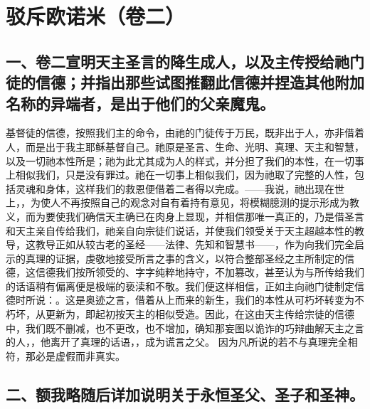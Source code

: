\section{驳斥欧诺米（卷二）}


\subsection{一、卷二宣明天主圣言的降生成人，以及主传授给祂门徒的信德；并指出那些试图推翻此信德并捏造其他附加名称的异端者，是出于他们的父亲魔鬼。}

基督徒的信德，按照我们主的命令，由祂的门徒传于万民，既非出于人，亦非借着人，而是出于我主耶稣基督自己。祂原是圣言、生命、光明、真理、天主和智慧，以及一切祂本性所是；祂为此尤其成为人的样式，并分担了我们的本性，在一切事上相似我们，只是没有罪过。祂在一切事上相似我们，因为祂取了完整的人性，包括灵魂和身体，这样我们的救恩便借着二者得以完成。\newline{}——我说，祂出现在世上，，为使人不再按照自己的观念对自有着持有意见，将模糊臆测的提示形成为教义，而为要使我们确信天主确已在肉身上显现，并相信那唯一真正的，乃是借圣言和天主亲自传给我们，祂亲自向宗徒们说话，并使我们领受关于天主超越本性的教导，这教导正如从较古老的圣经——法律、先知和智慧书——，作为向我们完全启示的真理的证据，虔敬地接受所言之事的含义，以符合整部圣经之主所制定的信德，这信德我们按所领受的、字字纯粹地持守，不加篡改，甚至认为与所传给我们的话语稍有偏离便是极端的亵渎和不敬。\newline{}我们便这样相信，正如主向祂门徒制定信德时所说：。这是奥迹之言，借着从上而来的新生，我们的本性从可朽坏转变为不朽坏，从更新为，即起初按天主的相似受造。\newline{}因此，在这由天主传给宗徒的信德中，我们既不删减，也不更改，也不增加，确知那妄图以诡诈的巧辩曲解天主之言的人，，他离开了真理的话语，，成为谎言之父。 因为凡所说的若不与真理完全相符，那必是虚假而非真实。\par


\subsection{二、额我略随后详加说明关于永恒圣父、圣子和圣神。}

